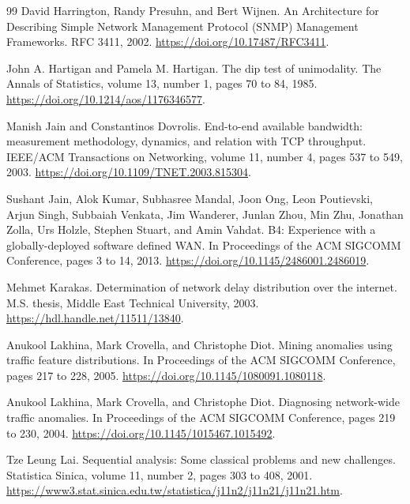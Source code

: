 \documentclass[a4paper,11pt]{report}
\begin{document}
\begin{thebibliography}{99}
David Harrington, Randy Presuhn, and Bert Wijnen.
\newblock An Architecture for Describing Simple Network Management Protocol (SNMP) Management Frameworks.
\newblock RFC 3411, 2002.
\newblock \url{https://doi.org/10.17487/RFC3411}.

John A. Hartigan and Pamela M. Hartigan.
\newblock The dip test of unimodality.
\newblock The Annals of Statistics, volume 13, number 1, pages 70 to 84, 1985.
\newblock \url{https://doi.org/10.1214/aos/1176346577}.

Manish Jain and Constantinos Dovrolis.
\newblock End-to-end available bandwidth: measurement methodology, dynamics, and relation with TCP throughput.
\newblock IEEE/ACM Transactions on Networking, volume 11, number 4, pages 537 to 549, 2003.
\newblock \url{https://doi.org/10.1109/TNET.2003.815304}.

Sushant Jain, Alok Kumar, Subhasree Mandal, Joon Ong, Leon Poutievski, Arjun Singh, Subbaiah Venkata, Jim Wanderer, Junlan Zhou, Min Zhu, Jonathan Zolla, Urs Holzle, Stephen Stuart, and Amin Vahdat.
\newblock B4: Experience with a globally-deployed software defined WAN.
\newblock In Proceedings of the ACM SIGCOMM Conference, pages 3 to 14, 2013.
\newblock \url{https://doi.org/10.1145/2486001.2486019}.

Mehmet Karakas.
\newblock Determination of network delay distribution over the internet.
\newblock M.S. thesis, Middle East Technical University, 2003.
\newblock \url{https://hdl.handle.net/11511/13840}.

Anukool Lakhina, Mark Crovella, and Christophe Diot.
\newblock Mining anomalies using traffic feature distributions.
\newblock In Proceedings of the ACM SIGCOMM Conference, pages 217 to 228, 2005.
\newblock \url{https://doi.org/10.1145/1080091.1080118}.

Anukool Lakhina, Mark Crovella, and Christophe Diot.
\newblock Diagnosing network-wide traffic anomalies.
\newblock In Proceedings of the ACM SIGCOMM Conference, pages 219 to 230, 2004.
\newblock \url{https://doi.org/10.1145/1015467.1015492}.

Tze Leung Lai.
\newblock Sequential analysis: Some classical problems and new challenges.
\newblock Statistica Sinica, volume 11, number 2, pages 303 to 408, 2001.
\newblock \url{https://www3.stat.sinica.edu.tw/statistica/j11n2/j11n21/j11n21.htm}.


\end{thebibliography}
\end{document}
